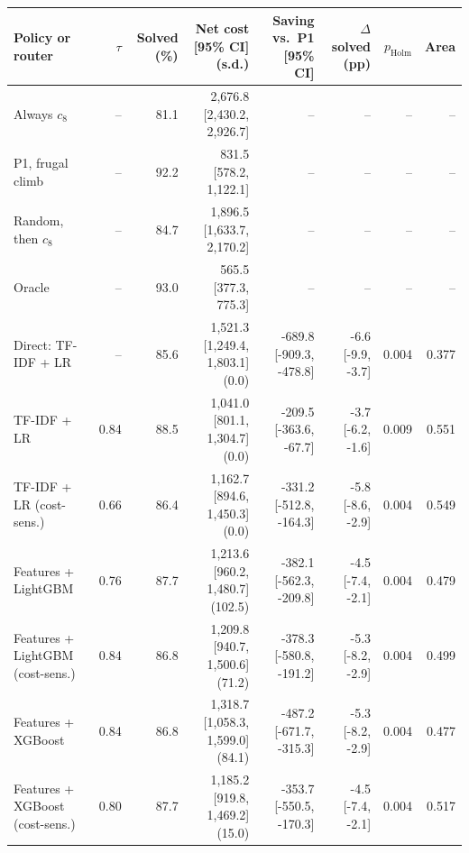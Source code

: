 \setlength{\tabcolsep}{4pt}
\begin{tabular}{@{}lrrrrrrr@{}}
\toprule
Policy or router & $\tau$ & Solved (\%) & Net cost [95\% CI] (s.d.) & Saving vs.\ P1 [95\% CI] & $\Delta$ solved (pp) & $p_{\mathrm{Holm}}$ & Area \\
\midrule
Always $c_8$ & -- & 81.1 & 2{,}676.8 [2{,}430.2, 2{,}926.7] & -- & -- & -- & -- \\
P1, frugal climb & -- & 92.2 & 831.5 [578.2, 1{,}122.1] & -- & -- & -- & -- \\
Random, then $c_8$ & -- & 84.7 & 1{,}896.5 [1{,}633.7, 2{,}170.2] & -- & -- & -- & -- \\
Oracle & -- & 93.0 & 565.5 [377.3, 775.3] & -- & -- & -- & -- \\
\midrule
Direct: TF-IDF + LR & -- & 85.6 & 1{,}521.3 [1{,}249.4, 1{,}803.1] (0.0) & -689.8 [-909.3, -478.8] & -6.6 [-9.9, -3.7] & 0.004 & 0.377 \\
TF-IDF + LR & 0.84 & 88.5 & 1{,}041.0 [801.1, 1{,}304.7] (0.0) & -209.5 [-363.6, -67.7] & -3.7 [-6.2, -1.6] & 0.009 & 0.551 \\
TF-IDF + LR (cost-sens.) & 0.66 & 86.4 & 1{,}162.7 [894.6, 1{,}450.3] (0.0) & -331.2 [-512.8, -164.3] & -5.8 [-8.6, -2.9] & 0.004 & 0.549 \\
Features + LightGBM & 0.76 & 87.7 & 1{,}213.6 [960.2, 1{,}480.7] (102.5) & -382.1 [-562.3, -209.8] & -4.5 [-7.4, -2.1] & 0.004 & 0.479 \\
Features + LightGBM (cost-sens.) & 0.84 & 86.8 & 1{,}209.8 [940.7, 1{,}500.6] (71.2) & -378.3 [-580.8, -191.2] & -5.3 [-8.2, -2.9] & 0.004 & 0.499 \\
Features + XGBoost & 0.84 & 86.8 & 1{,}318.7 [1{,}058.3, 1{,}599.0] (84.1) & -487.2 [-671.7, -315.3] & -5.3 [-8.2, -2.9] & 0.004 & 0.477 \\
Features + XGBoost (cost-sens.) & 0.80 & 87.7 & 1{,}185.2 [919.8, 1{,}469.2] (15.0) & -353.7 [-550.5, -170.3] & -4.5 [-7.4, -2.1] & 0.004 & 0.517 \\
\bottomrule
\end{tabular}
